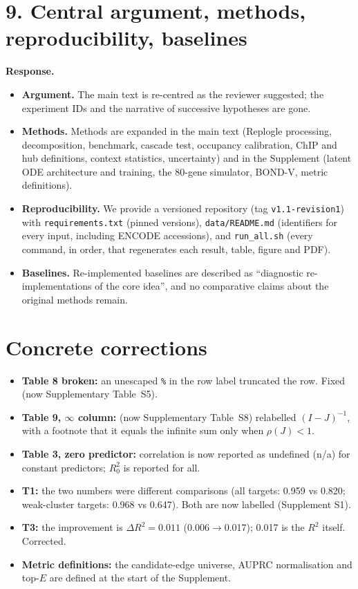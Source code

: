\documentclass[10pt]{article}
\newcommand{\resp}{\par\smallskip\noindent\textbf{Response.} }
\begin{document}
\section*{9. Central argument, methods, reproducibility, baselines}
\resp
\begin{itemize}
\item \textbf{Argument.} The main text is re-centred as the reviewer suggested; the experiment IDs and the narrative of successive hypotheses are gone.
\item \textbf{Methods.} Methods are expanded in the main text (Replogle processing, decomposition, benchmark, cascade test, occupancy calibration, ChIP and hub definitions, context statistics, uncertainty) and in the Supplement (latent ODE architecture and training, the 80-gene simulator, BOND-V, metric definitions).
\item \textbf{Reproducibility.} We provide a versioned repository (tag \texttt{v1.1-revision1}) with \texttt{requirements.txt} (pinned versions), \texttt{data/README.md} (identifiers for every input, including ENCODE accessions), and \texttt{run\_all.sh} (every command, in order, that regenerates each result, table, figure and PDF).
\item \textbf{Baselines.} Re-implemented baselines are described as ``diagnostic re-implementations of the core idea'', and no comparative claims about the original methods remain.
\end{itemize}

\section*{Concrete corrections}
\begin{itemize}
\item \textbf{Table 8 broken:} an unescaped \texttt{\%} in the row label truncated the row. Fixed (now Supplementary Table~S5).
\item \textbf{Table 9, $\infty$ column:} (now Supplementary Table~S8) relabelled $(I-J)^{-1}$, with a footnote that it equals the infinite sum only when $\rho(J)<1$.
\item \textbf{Table 3, zero predictor:} correlation is now reported as undefined (n/a) for constant predictors; $R^2_0$ is reported for all.
\item \textbf{T1:} the two numbers were different comparisons (all targets: 0.959 vs 0.820; weak-cluster targets: 0.968 vs 0.647). Both are now labelled (Supplement S1).
\item \textbf{T3:} the improvement is $\Delta R^2=0.011$ (0.006$\to$0.017); 0.017 is the $R^2$ itself. Corrected.
\item \textbf{Metric definitions:} the candidate-edge universe, AUPRC normalisation and top-$E$ are defined at the start of the Supplement.
\end{itemize}
\end{document}
